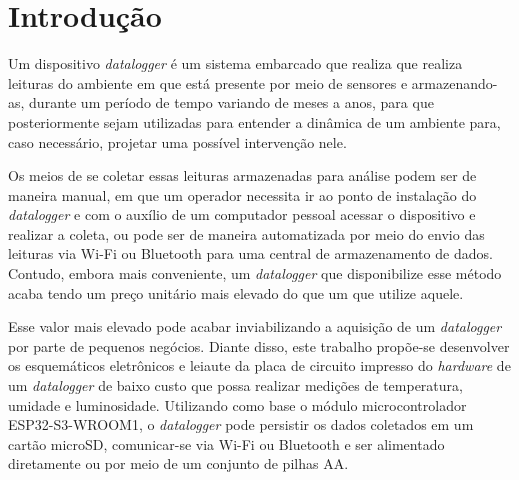 \chapter{Introdução}
\label{cap:introducao}






Um dispositivo \textit{datalogger} é um sistema embarcado que realiza que realiza leituras do ambiente em que está presente por meio de sensores e armazenando-as, durante um período de tempo variando de meses a anos, para que posteriormente sejam utilizadas para entender a dinâmica de um ambiente para, caso necessário, projetar uma possível intervenção nele.

Os meios de se coletar essas leituras armazenadas para análise podem ser de maneira manual, em que um operador necessita ir ao ponto de instalação do \textit{datalogger} e com o auxílio de um computador pessoal acessar o dispositivo e realizar a coleta, ou pode ser de maneira automatizada por meio do envio das leituras via Wi-Fi ou Bluetooth para uma central de armazenamento de dados. Contudo, embora mais conveniente, um \textit{datalogger} que disponibilize esse método acaba tendo um preço unitário mais elevado do que um que utilize aquele. 

Esse valor mais elevado pode acabar inviabilizando a aquisição de um \textit{datalogger} por parte de pequenos negócios. Diante disso, este trabalho propõe-se desenvolver os esquemáticos eletrônicos e leiaute da placa de circuito impresso do \textit{hardware} de um \textit{datalogger} de baixo custo que possa realizar medições de temperatura, umidade e luminosidade. Utilizando como base o módulo microcontrolador ESP32-S3-WROOM1, o \textit{datalogger} pode persistir os dados coletados em um cartão microSD, comunicar-se via Wi-Fi ou Bluetooth e ser alimentado diretamente ou por meio de um conjunto de pilhas AA. 











